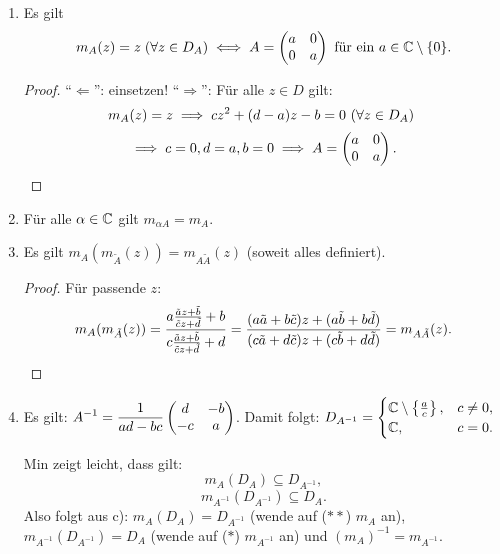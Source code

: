 \documentclass[a4paper,twoside,DIV15,BCOR12mm]{scrbook}
\begin{document}
\begin{enumerate}
\item Es gilt
  \[m_A(z) = z \; (\forall z \in D_A) \iff A = \left(\!\!\!\begin{array}{c c}a&0\\0&a\end{array}\!\!\!\right) \text { für ein } a \in \mathbb{C} \setminus \{0\}.\]
  \begin{proof}
    "`$\Leftarrow$"': einsetzen! "`$\Rightarrow$"': Für alle $z\in D$ gilt:
    \[m_A(z)=z \implies cz^2 + (d-a)z - b = 0 \text{ (}\forall z\in D_A\text{) }\]
    \[\implies c=0, d=a, b=0 \implies A = \left(\!\!\!\begin{array}{c c}a&0\\0&a\end{array}\!\!\!\right). \qedhere\]
  \end{proof}
\item Für alle $\alpha\in\mathbb{C}$ gilt $m_{\alpha A} = m_A$.
\item Es gilt $m_A(m_{\tilde{A}}(z)) = m_{A\tilde{A}}(z)$ (soweit alles definiert).
\begin{proof} Für passende $z$:
  \[m_A(m_{\tilde{A}}(z)) =
  \frac{a\frac{\tilde{a}z+\tilde{b}}{\tilde{c}z+\tilde{d}}+b}{c\frac{\tilde{a}z+\tilde{b}}{\tilde{c}z+\tilde{d}}+d} =
  \frac{(a\tilde{a}+b\tilde{c})z+(a\tilde{b}+b\tilde{d})}{(c\tilde{a}+d\tilde{c})z+(c\tilde{b}+d\tilde{d})} =
  m_{A\tilde{A}}(z). \qedhere\]
\end{proof}
\item Es gilt: $\displaystyle A^{-1} = \frac{1}{ad-bc}\left(\!\!\!\begin{array}{c c}d&-b\\-c&a\end{array}\!\!\!\right)$. Damit folgt: $\displaystyle D_{A^{-1}}=
  \begin{cases} \mathbb{C}\setminus\left\{\frac{a}{c}\right\},&c\neq 0,\\\mathbb{C},&c=0.\end{cases}$

Min zeigt leicht, dass gilt:
\[m_A(D_A) \subseteq D_{A^{-1}},\tag{$\ast$}\]
\[m_{A^{-1}}(D_{A^{-1}}) \subseteq D_A.\tag{$\ast\ast$}\]
Also folgt aus c): $m_A(D_A) = D_{A^{-1}}$ (wende auf ($**$) $m_A$ an), $m_{A^{-1}}(D_{A^{-1}}) = D_A$ (wende auf ($*$) $m_{A^{-1}}$ an) und $(m_A)^{-1} = m_{A^{-1}}$.


\end{enumerate}
\end{document}
